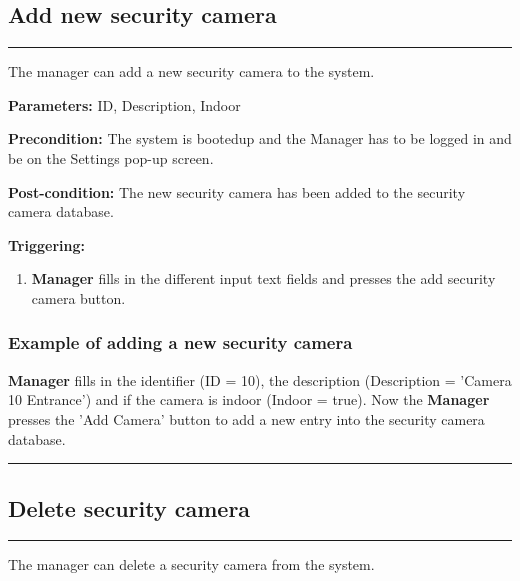 \subsection{Add new security camera}
\hrule
\hfill
\vspace{0.5cm}
\label{operation:Add new security camera}

The manager can add a new security camera to the system.

\begin{description}

\item \textbf{Parameters:} ID, Description, Indoor
\item \textbf{Precondition:} The system is bootedup and the Manager has to be
logged in and be on the Settings pop-up screen.
\item \textbf{Post-condition:} The new security camera has been added to the security camera database.
\item \textbf{Triggering:}
\begin{enumerate}

\item \textbf{Manager} fills in the different input text fields and presses
the add security camera button.

\end{enumerate}
\end{description}

\subsubsection{Example of adding a new security camera}
\textbf{Manager} fills in the identifier (ID = 10), the description (Description = 'Camera 10 Entrance') and if the camera is indoor (Indoor = true). 
Now the \textbf{Manager} presses the 'Add Camera' button to add a new entry into the security camera database.
\hfill
\vspace{0.5cm}
\hrule

\break

\subsection{Delete security camera}
\hrule
\hfill
\vspace{0.5cm}
\label{operation:Delete security camera}

The manager can delete a security camera from the system.


